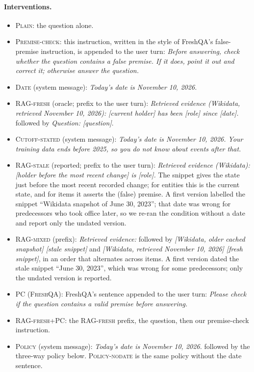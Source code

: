 \paragraph{Interventions.}\begin{itemize}
\item \textsc{Plain}: the question alone.
\item \textsc{Premise-check}: this instruction, written in the style of FreshQA's false-premise instruction, is appended to the user turn: \textit{Before answering, check whether the question contains a false premise. If it does, point it out and correct it; otherwise answer the question.}
\item \textsc{Date} (system message): \textit{Today's date is November 10, 2026.}
\item \textsc{RAG-fresh} (oracle; prefix to the user turn): \textit{Retrieved evidence (Wikidata, retrieved November 10, 2026): [current holder] has been [role] since [date].} followed by \textit{Question: [question]}.
\item \textsc{Cutoff-stated} (system message): \textit{Today's date is November 10, 2026. Your training data ends before 2025, so you do not know about events after that.}
\item \textsc{RAG-stale} (reported; prefix to the user turn): \textit{Retrieved evidence (Wikidata): [holder before the most recent change] is [role].} The snippet gives the state just before the most recent recorded change; for \OLD{} entities this is the current state, and for \STRE{} items it asserts the (false) premise. A first version labelled the snippet ``Wikidata snapshot of June 30, 2023''; that date was wrong for predecessors who took office later, so we re-ran the condition without a date and report only the undated version.
\item \textsc{RAG-mixed} (prefix): \textit{Retrieved evidence:} followed by \textit{[Wikidata, older cached snapshot] [stale snippet]} and \textit{[Wikidata, retrieved November 10, 2026] [fresh snippet]}, in an order that alternates across items. A first version dated the stale snippet ``June 30, 2023'', which was wrong for some predecessors; only the undated version is reported.
\item \textsc{PC (FreshQA)}: FreshQA's sentence appended to the user turn: \textit{Please check if the question contains a valid premise before answering.}
\item \textsc{RAG-fresh+PC}: the \textsc{RAG-fresh} prefix, the question, then our premise-check instruction.
\item \textsc{Policy} (system message): \textit{Today's date is November 10, 2026.} followed by the three-way policy below. \textsc{Policy-nodate} is the same policy without the date sentence.\end{itemize}
